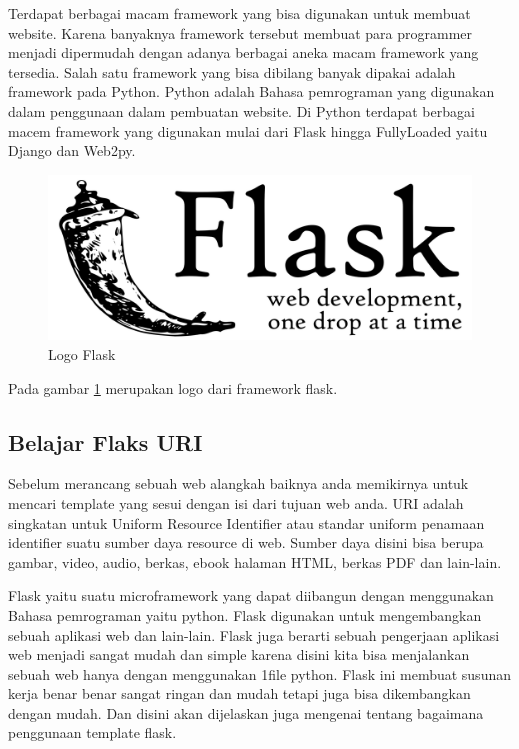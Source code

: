 Terdapat berbagai macam framework yang bisa digunakan untuk membuat website. Karena banyaknya framework tersebut membuat para 
programmer menjadi dipermudah dengan adanya berbagai aneka macam framework yang tersedia. Salah satu framework yang bisa dibilang 
banyak dipakai adalah framework pada Python. Python adalah Bahasa pemrograman yang digunakan dalam penggunaan dalam pembuatan website. 
Di Python terdapat berbagai macem framework yang digunakan mulai dari Flask hingga FullyLoaded yaitu Django dan Web2py.

\begin{figure}[ht]
\centerline{\includegraphics[width=1\textwidth]{figures/5logoflask.jpg}}
\caption{Logo Flask}
\label{logo}
\end{figure}

Pada gambar \ref{logo} merupakan logo dari framework flask.

\subsection{Belajar Flaks URI}
Sebelum merancang sebuah web alangkah baiknya anda memikirnya untuk mencari template yang sesui dengan isi dari tujuan web anda.  URI 
adalah singkatan untuk Uniform Resource Identifier atau standar uniform penamaan identifier suatu sumber daya resource di web. Sumber 
daya disini bisa berupa gambar, video, audio, berkas, ebook halaman HTML, berkas PDF dan lain-lain. 


Flask yaitu suatu microframework yang dapat diibangun dengan menggunakan Bahasa pemrograman yaitu python. Flask digunakan untuk 
mengembangkan sebuah aplikasi web dan lain-lain. Flask juga berarti sebuah pengerjaan aplikasi web menjadi sangat mudah dan simple 
karena disini kita bisa menjalankan sebuah web hanya dengan menggunakan 1file python. Flask ini membuat susunan kerja benar benar 
sangat ringan dan mudah tetapi juga bisa dikembangkan dengan mudah.  Dan disini akan dijelaskan juga mengenai tentang bagaimana 
penggunaan template flask.

